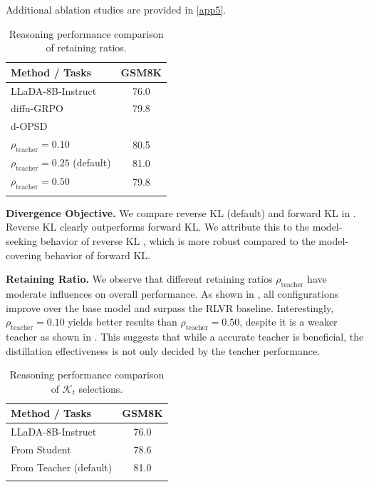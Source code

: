 \documentclass{llmxive}
\begin{document}
Additional ablation studies are provided in \cref{app5}.

\begin{table}[t]
\vspace{-25pt}
\setlength{\tabcolsep}{4pt}
\centering
\begin{tabular}{lc}
\toprule
\textbf{Method / Tasks} & \textbf{GSM8K} \\
\midrule
LLaDA-8B-Instruct & 76.0  \\
diffu-GRPO & 79.8 \\
d-OPSD \\
\quad $\rho_\text{teacher}=0.10$ & 80.5 \\
\quad $\rho_\text{teacher}=0.25$ (default) & \cellcolor{lightblue} 81.0 \\
\quad $\rho_\text{teacher}=0.50$ & 79.8 \\
\bottomrule
\label{tab6}
\end{tabular}
\vspace{-25pt}

\caption{Reasoning performance comparison of retaining ratios.}
\end{table}

\textbf{Divergence Objective. } We compare reverse KL (default) and forward KL in . Reverse KL clearly outperforms forward KL. We attribute this to the model-seeking behavior of reverse KL \citep{agarwal2024policy}, which is more robust compared to the model-covering behavior of forward KL.

\textbf{Retaining Ratio. } We observe that different retaining ratios $\rho_\text{teacher}$ have moderate influences on overall performance. As shown in , all configurations improve over the base model and surpass the RLVR baseline. Interestingly, $\rho_\text{teacher}=0.10$ yields better results than $\rho_\text{teacher}=0.50$, despite it is a weaker teacher as shown in . This suggests that while a accurate teacher is beneficial, the distillation effectiveness is not only decided by the teacher performance.

\begin{table}[t]
\vspace{-15pt}
\setlength{\tabcolsep}{4pt}
\centering
\begin{tabular}{lc}
\toprule
\textbf{Method / Tasks} & \textbf{GSM8K} \\
\midrule
LLaDA-8B-Instruct & 76.0 \\
From Student & 78.6 \\
From Teacher (default) & \cellcolor{lightblue} 81.0 \\
\bottomrule
\label{tab7}
\end{tabular}
\vspace{-20pt}

\caption{Reasoning performance comparison of $\mathcal{K}_t$ selections.}
\end{table}
\end{document}
